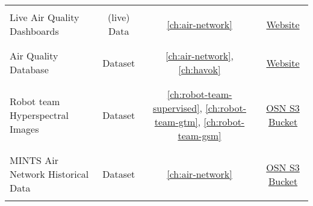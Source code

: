 \begin{table}[!h]
\begin{center}
{\begin{tabular}{lccc}
      & & & \\
      Live Air Quality Dashboards & (live) Data & \ref{ch:air-network} & \href{http://mdash.circ.utdallas.edu:3000}{Website} \\
      & & & \\ \hline
      & & & \\
      Air Quality Database & Dataset & \ref{ch:air-network},\ref{ch:havok} & \href{http://mdash.circ.utdallas.edu:8086}{Website} \\
      & & & \\ \hline
      & & & \\
      Robot team Hyperspectral Images & Dataset & \ref{ch:robot-team-supervised}, \ref{ch:robot-team-gtm}, \ref{ch:robot-team-gsm} & \href{https://ncsa.oxn.xsede.org/ees230012-bucket01}{OSN S3 Bucket} \\
      & & & \\ \hline
      & & & \\
      MINTS Air Network Historical Data  & Dataset & \ref{ch:air-network} & \href{https://ncsa.oxn.xsede.org/ees230012-bucket01}{OSN S3 Bucket} \\
      & & & \\ \hline
    \end{tabular}}
  \end{center}
\end{table}















